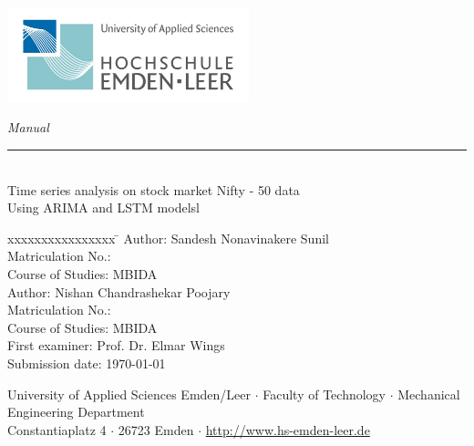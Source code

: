 %
%

\begin{titlepage}
    
    \begin{flushleft} 
        \includegraphics[width=7cm]{Images/logo.jpg}
    \end{flushleft} 
    
    \begin{flushright}
        \vspace{2cm}
        \LARGE \textsl{Manual}\\
        \rule{0.6\textwidth}{0.4pt} ~\\
        \vspace{0.5cm}
        \textsf{\LARGE Time series analysis on stock market Nifty - 50 data}\\
        \textsf{\LARGE Using ARIMA and LSTM modelsl}
    \end{flushright}
    
    \vspace{3cm}
    \large
    \begin{tabbing}
        xxxxxxxxxxxxxxxx \= \kill
        Author: \> Sandesh Nonavinakere Sunil \\
        Matriculation No.:  \\
        Course of Studies: \> MBIDA \\ [0.5cm]
         Author: \> Nishan Chandrashekar Poojary \\
        Matriculation No.:  \\
        Course of Studies: \> MBIDA \\ [0.5cm]
        First examiner: \> Prof. Dr. Elmar Wings \\
        Submission date: \> \today \\
    \end{tabbing}
    
    \vspace{1cm}
    \small
    \begin{center}
        University of Applied Sciences Emden/Leer $\cdot$ 
        Faculty of Technology $\cdot$ 
        Mechanical Engineering Department \\
        Constantiaplatz 4 $\cdot$ 
        26723 Emden $\cdot$ 
        \url{http://www.hs-emden-leer.de}
    \end{center}
    
\end{titlepage}
